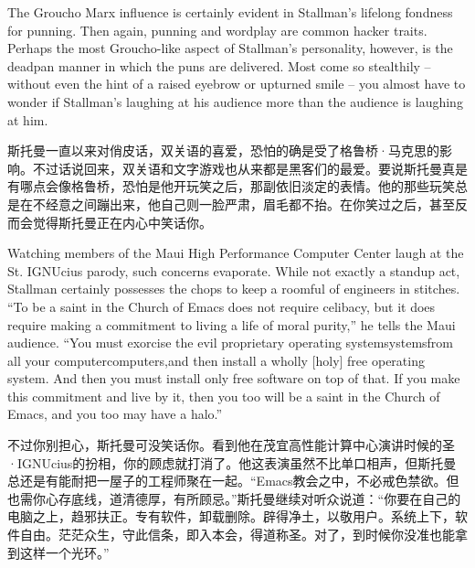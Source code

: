 \ifdefined\eng
The Groucho Marx influence is certainly evident in Stallman's lifelong fondness for punning. Then again, punning and wordplay are common hacker traits. Perhaps the most Groucho-like aspect of Stallman's personality, however, is the deadpan manner in which the puns are delivered. Most come so stealthily -- without even the hint of a raised eyebrow or upturned smile -- you almost have to wonder if Stallman's laughing at his audience more than the audience is laughing at him.
\fi

\ifdefined\chs
斯托曼一直以来对俏皮话，双关语的喜爱，恐怕的确是受了格鲁桥·马克思的影响。不过话说回来，双关语和文字游戏也从来都是黑客们的最爱。要说斯托曼真是有哪点会像格鲁桥，恐怕是他开玩笑之后，那副依旧淡定的表情。他的那些玩笑总是在不经意之间蹦出来，他自己则一脸严肃，眉毛都不抬。在你笑过之后，甚至反而会觉得斯托曼正在内心中笑话你。
\fi

\ifdefined\eng
Watching members of the Maui High Performance Computer Center laugh at the St. IGNUcius parody, such concerns evaporate. While not exactly a standup act, Stallman certainly possesses the chops to keep a roomful of engineers in stitches. ``To be a saint in the Church of Emacs does not require celibacy, but it does require making a commitment to living a life of moral purity,'' he tells the Maui audience. ``You must exorcise the evil proprietary operating \ifdefined\vone system\fi\ifdefined\vtwo systems\fi from all your \ifdefined\vone computer\fi\ifdefined\vtwo computers,\fi and then install a wholly [holy] free operating system. And then you must install only free software on top of that. If you make this commitment and live by it, then you too will be a saint in the Church of Emacs, and you too may have a halo.''
\fi

\ifdefined\chs
不过你别担心，斯托曼可没笑话你。看到他在茂宜高性能计算中心演讲时候的圣·IGNUcius的扮相，你的顾虑就打消了。他这表演虽然不比单口相声，但斯托曼总还是有能耐把一屋子的工程师聚在一起。``Emacs教会之中，不必戒色禁欲。但也需你心存底线，道清德厚，有所顾忌。''斯托曼继续对听众说道：``你要在自己的电脑之上，趋邪扶正。专有软件，卸载删除。辟得净土，以敬用户。系统上下，软件自由。茫茫众生，守此信条，即入本会，得道称圣。对了，到时候你没准也能拿到这样一个光环。''
\fi


